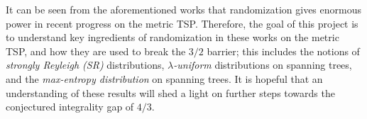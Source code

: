 \documentclass[letterpaper, reqno,12pt]{article}
\begin{document}
It can be seen from the aforementioned works that randomization gives enormous power in recent progress on the metric TSP. Therefore, the goal of this project is to understand key ingredients of randomization in these works on the metric TSP, and how they are used to break the $3/2$ barrier; this includes the notions of \emph{strongly Reyleigh (SR)} distributions, \emph{$\lambda$-uniform} distributions on spanning trees, and the \emph{max-entropy distribution} on spanning trees. It is hopeful that an understanding of these results will shed a light on further steps towards the conjectured integrality gap of $4/3$.



\end{document}

